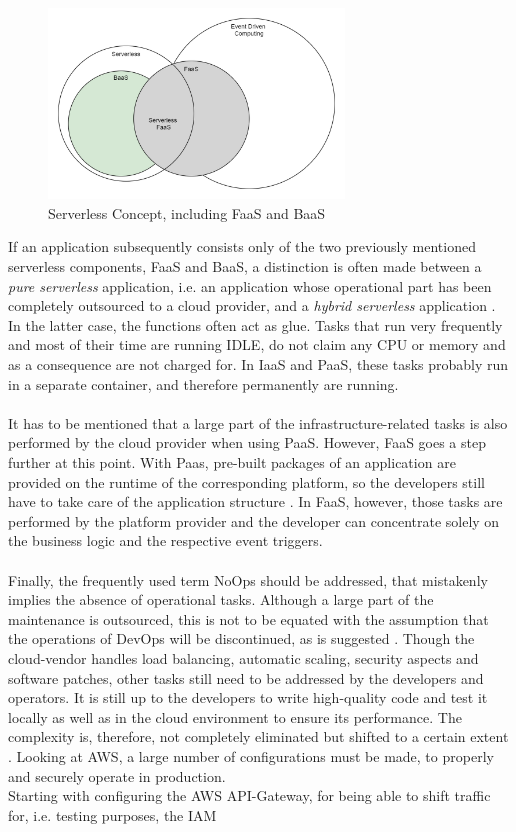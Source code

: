 \documentclass[11pt]{article}
\begin{document}
\begin{figure}[H]
\caption{Serverless Concept, including FaaS and BaaS}
\label{fig:serverlessBaaSandPaas}
\centering
\includegraphics[width=0.7\textwidth]{Serverless}
\end{figure} 
If an application subsequently consists only of the two previously mentioned serverless components, FaaS and BaaS, a distinction is often made between a \textit{pure serverless} application, i.e. an application whose operational part has been completely outsourced to a cloud provider, and a \textit{hybrid serverless} application \cite{leitner2019mixed}. In the latter case, the functions often act as glue. Tasks that run very frequently and most of their time are running IDLE, do not claim any CPU or memory and as a consequence are not charged for. In IaaS and PaaS, these tasks probably run in a separate container, and therefore permanently are running.\\\\ It has to be mentioned that a large part of the infrastructure-related tasks is also performed by the cloud provider when using PaaS. However, FaaS goes a step further at this point. With Paas, pre-built packages of an application are provided on the runtime of the corresponding platform, so the developers still have to take care of the application structure \cite{kaplan2019framework}. In FaaS, however, those tasks are performed by the platform provider and the developer can concentrate solely on the business logic and the respective event triggers.\\\\ Finally, the frequently used term \glqq NoOps\grqq{} \cite{fowler2018serverless} should be addressed, that mistakenly implies the absence of operational tasks. Although a large part of the maintenance is outsourced, this is not to be equated with the assumption that the operations of DevOps will be discontinued, as is suggested \cite{fowler2018serverless}.  Though the cloud-vendor handles load balancing, automatic scaling, security aspects and software patches, other tasks still need to be addressed by the developers and operators. It is still up to the developers to write high-quality code and test it locally as well as in the cloud environment to ensure its performance. The complexity is, therefore, not completely eliminated but shifted to a certain extent \cite{eivy2017wary}. Looking at AWS, a large number of configurations must be made, to properly and securely operate in production.\\ Starting with configuring the AWS API-Gateway, for being able to shift traffic for, i.e. testing purposes, the IAM 
\end{document}
